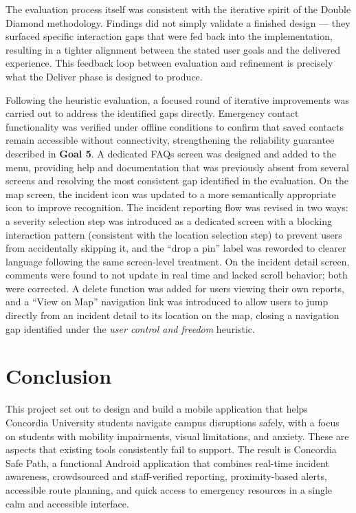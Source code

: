 \documentclass[sigconf]{acmart}
\begin{document}
The evaluation process itself was consistent with the iterative spirit of the Double Diamond methodology. Findings did not simply validate a finished design --- they surfaced specific interaction gaps that were fed back into the implementation, resulting in a tighter alignment between the stated user goals and the delivered experience. This feedback loop between evaluation and refinement is precisely what the Deliver phase is designed to produce.
 
Following the heuristic evaluation, a focused round of iterative improvements was carried out to address the identified gaps directly. Emergency contact functionality was verified under offline conditions to confirm that saved contacts remain accessible without connectivity, strengthening the reliability guarantee described in \textbf{Goal 5}. A dedicated FAQs screen was designed and added to the menu, providing help and documentation that was previously absent from several screens and resolving the most consistent gap identified in the evaluation. On the map screen, the incident icon was updated to a more semantically appropriate icon to improve recognition. The incident reporting flow was revised in two ways: a severity selection step was introduced as a dedicated screen with a blocking interaction pattern (consistent with the location selection step) to prevent users from accidentally skipping it, and the ``drop a pin'' label was reworded to clearer language following the same screen-level treatment. On the incident detail screen, comments were found to not update in real time and lacked scroll behavior; both were corrected. A delete function was added for users viewing their own reports, and a ``View on Map'' navigation link was introduced to allow users to jump directly from an incident detail to its location on the map, closing a navigation gap identified under the \textit{user control and freedom} heuristic.
 
\section{Conclusion}
\label{sec:conclusion}
This project set out to design and build a mobile application that helps Concordia University students navigate campus disruptions safely, with a focus on students with mobility impairments, visual limitations, and anxiety. These are aspects that existing tools consistently fail to support. The result is Concordia Safe Path, a functional Android application that combines real-time incident awareness, crowdsourced and staff-verified reporting, proximity-based alerts, accessible route planning, and quick access to emergency resources in a single calm and accessible interface.
 
\end{document}
